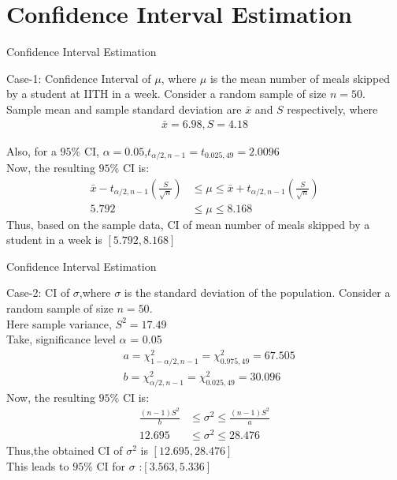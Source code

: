 \documentclass{beamer}
\begin{document}
\section{Confidence Interval Estimation}
\begin{frame}{Confidence Interval Estimation}
    \begin{block}{Case-1: Confidence Interval of $\mu$, where $\mu$ is the mean number of meals skipped by a student at IITH in a week. }
       Consider a random sample of size $n = 50$. 
       Sample mean and sample standard deviation are $\bar{x}$ and $S$ respectively, where
        \begin{align*}
            \bar{x}= 6.98, 
            S = 4.18 
        \end{align*}       
      
Also, for a $95\%$ CI, $\alpha=0.05$,$t_{\alpha/2,n-1} =t_{0.025,49}=2.0096$ \\
Now, the resulting $95\%$ CI is:
      \begin{align*}
        \bar{x}-t_{\alpha/2,n-1}\left(\frac{S}{\sqrt{n}}\right) &\leq \mu \leq \bar{x}+t_{\alpha/2,n-1}\left(\frac{S}{\sqrt{n}}\right)\\
        5.792 &\leq \mu \leq 8.168
      \end{align*}
      Thus, based on the sample data, CI of mean number of meals skipped by a student in a week is $[5.792,8.168]$ 
      \end{block}
\end{frame}

\begin{frame}{Confidence Interval Estimation}
    \begin{block}{Case-2: CI of $\sigma$,where $\sigma$ is the standard deviation of the population. }
       Consider a random sample of size $n = 50$.   \\
       Here sample variance,    $S^2 = 17.49$  \\
       Take, significance level $\alpha$ = 0.05                
        \begin{align*}
            &a = \chi^{2}_{1-\alpha/2,n-1} = \chi^{2}_{0.975,49} =67.505 \\
            &b = \chi^{2}_{\alpha/2,n-1} = \chi^{2}_{0.025,49} = 30.096
        \end{align*} 
        Now, the resulting $95\%$ CI is:
        \begin{align*}
            \frac{(n-1)S^2}{b} &\leq \sigma^2 \leq \frac{(n-1)S^2}{a}\\
            12.695 &\leq \sigma^2 \leq 28.476
          \end{align*}
          Thus,the obtained CI of $\sigma^2$ is $[12.695,28.476]$\\
          This leads to $95\%$ CI for $\sigma$ :$[3.563,5.336]$ 
           \end{block}
\end{frame}
\end{document}
